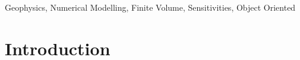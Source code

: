 \documentclass[preprint,review,3p,times,onecolumn,authoryear]{elsarticle}
\newcommand{\SimPEG}{\textsc{SimPEG}\xspace}
\begin{document}
\begin{frontmatter}
{\begin{abstract}

\end{abstract}

\begin{keyword}
Geophysics, Numerical Modelling, Finite Volume, Sensitivities, Object Oriented
\end{keyword}
}

\end{frontmatter}

\linenumbers



\section{Introduction}
\label{sec:intro}
\end{document}
